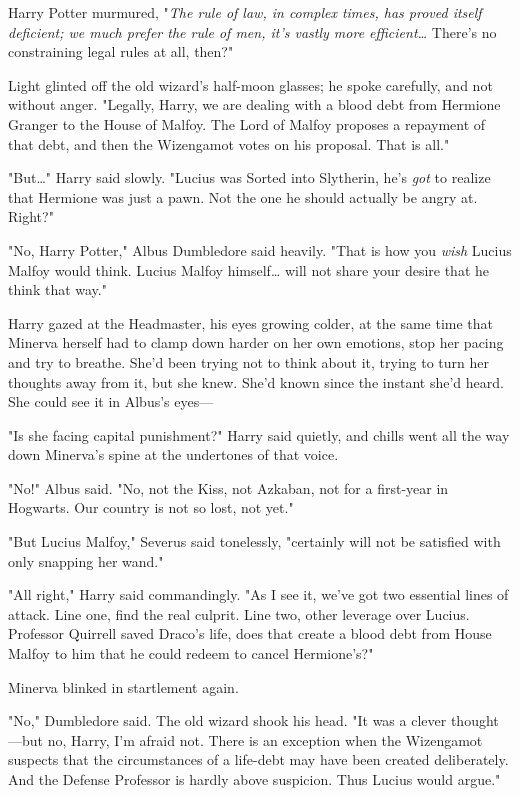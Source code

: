 Harry Potter murmured, "\emph{The rule of law, in complex times, has proved itself deficient; we much prefer the rule of men, it's vastly more efficient{\ldots}} There's no constraining legal rules at all, then?"

Light glinted off the old wizard's half-moon glasses; he spoke carefully, and not without anger. "Legally, Harry, we are dealing with a blood debt from Hermione Granger to the House of Malfoy. The Lord of Malfoy proposes a repayment of that debt, and then the Wizengamot votes on his proposal. That is all."

"But{\ldots}" Harry said slowly. "Lucius was Sorted into Slytherin, he's \emph{got} to realize that Hermione was just a pawn. Not the one he should actually be angry at. Right?"

"No, Harry Potter," Albus Dumbledore said heavily. "That is how you \emph{wish} Lucius Malfoy would think. Lucius Malfoy himself{\ldots} will not share your desire that he think that way."

Harry gazed at the Headmaster, his eyes growing colder, at the same time that Minerva herself had to clamp down harder on her own emotions, stop her pacing and try to breathe. She'd been trying not to think about it, trying to turn her thoughts away from it, but she knew. She'd known since the instant she'd heard. She could see it in Albus's eyes---

"Is she facing capital punishment?" Harry said quietly, and chills went all the way down Minerva's spine at the undertones of that voice.

"No!" Albus said. "No, not the Kiss, not Azkaban, not for a first-year in Hogwarts. Our country is not so lost, not yet."

"But Lucius Malfoy," Severus said tonelessly, "certainly will not be satisfied with only snapping her wand."

"All right," Harry said commandingly. "As I see it, we've got two essential lines of attack. Line one, find the real culprit. Line two, other leverage over Lucius. Professor Quirrell saved Draco's life, does that create a blood debt from House Malfoy to him that he could redeem to cancel Hermione's?"

Minerva blinked in startlement again.

"No," Dumbledore said. The old wizard shook his head. "It was a clever thought---but no, Harry, I'm afraid not. There is an exception when the Wizengamot suspects that the circumstances of a life-debt may have been created deliberately. And the Defense Professor is hardly above suspicion. Thus Lucius would argue."

